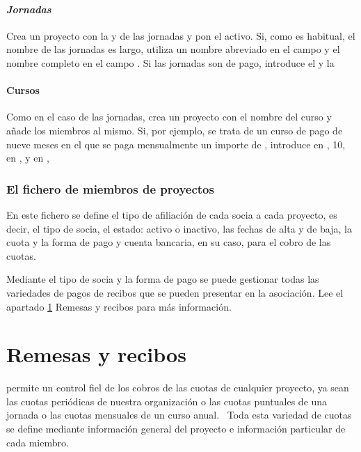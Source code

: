 \paragraph[Jornadas]{\bfseries\itshape Jornadas}
Crea un proyecto con la  y
 de las jornadas y pon el
 activo. Si, como es habitual, el nombre de
las jornadas es largo, utiliza un nombre abreviado en el campo
 y el nombre completo en el campo
. Si las jornadas son de pago,
introduce el  y la


\paragraph{Cursos}
Como en el caso de las jornadas, crea un proyecto con el nombre del
curso y añade los miembros al mismo. Si, por ejemplo, se trata de un
curso de pago de nueve meses en el que se paga mensualmente un importe
de , introduce en
, 10{\texteuro}, en
,
\textstyleGUIELEMENT{ }y en
, 

\subsubsection{El fichero de miembros de proyectos}
En este fichero se define el tipo de afiliación de cada socia a cada
proyecto, es decir, el tipo de socia, el estado: activo o inactivo, las
fechas de alta y de baja, la cuota y la forma de pago y cuenta
bancaria, en su caso, para el cobro de las cuotas.

Mediante el tipo de socia y la forma de pago se puede gestionar todas
las variedades de pagos de recibos que se pueden presentar en la
asociación. Lee el apartado \ref{ref:Remesasyrecibos} Remesas y
recibos para más información.

\section{Remesas y recibos}
\label{ref:Remesasyrecibos}\appname permite un control fiel de los
cobros de las cuotas de cualquier proyecto, ya sean las cuotas
periódicas de nuestra organización o las cuotas puntuales de una
jornada o las cuotas mensuales de un curso anual. \ Toda esta variedad
de cuotas se define mediante información general del proyecto e
información particular de cada miembro.

